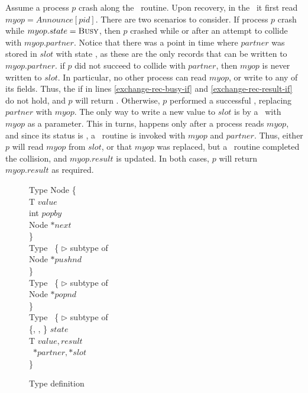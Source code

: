 Assume a process $p$ crash along the \exchange\ routine. Upon recovery, in the \recoverExchange\, it first read $myop = Announce[pid]$. There are two scenarios to consider.
If process $p$ crash while $myop.state = \mbox{\sc Busy}$, then $p$ crashed while or after an attempt to collide with $myop.partner$. Notice that there was a point in time where $partner$ was stored in $slot$ with state \waiting, as these are the only records that can be written to $myop.partner$. if $p$ did not succeed to collide with $partner$, then $myop$ is never written to $slot$. In particular, no other process can read $myop$, or write to any of its fields. Thus, the if in lines \ref{exchange-rec-busy-if} and \ref{exchange-rec-result-if} do not hold, and $p$ will return \fail.
Otherwise, $p$ performed a successful \CAS, replacing $partner$ with $myop$. The only way to write a new value to $slot$ is by a \CAS\ with $myop$ as a parameter. This in turns, happens only after a process reads $myop$, and since its status is \busy, a \switchPair\ routine is invoked with $myop$ and $partner$. Thus, either $p$ will read $myop$ from $slot$, or that $myop$ was replaced, but a \switchPair\ routine completed the collision, and $myop.result$ is updated. In both cases, $p$ will return $myop.result$ as required.


\begin{figure*}[b]
	\small
	
	Type Node \{ \\
		\hspace*{6mm} T $value$ \\
		\hspace*{6mm} int $popby$ \\
		\hspace*{6mm} Node $*next$ \\
	\} \\
	
	
	Type \pushInfo\ \{ \hspace*{20.0mm} $\triangleright$ subtype of \Info \\
		\hspace*{6mm} Node $*pushnd$ \\
	\} \\
	
	Type \popInfo\ \{ \hspace*{22.0mm} $\triangleright$ subtype of \Info \\
		\hspace*{6mm} Node $*popnd$ \\
	\} \\
	
	
	Type \exInfo\ \{ \hspace*{24.0mm} $\triangleright$ subtype of \Info \\
	\hspace*{6mm} \{\emptyst, \waiting, \busy\} $state$ \\
	\hspace*{6mm} T $value, result$ \\
	\hspace*{6mm} \exInfo\ $*partner, *slot$ \\
	\}
	
	\caption{Type definition}
\end{figure*}



